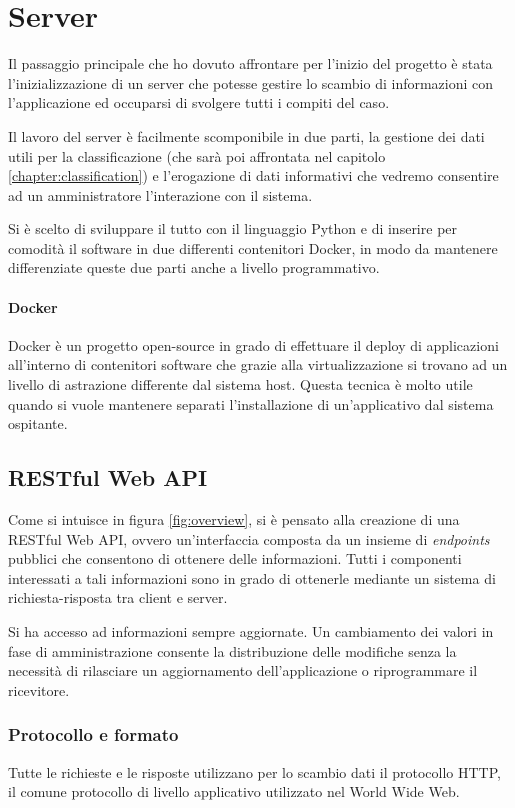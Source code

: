 \chapter{Server}
Il passaggio principale che ho dovuto affrontare per l'inizio del progetto è stata l'inizializzazione
di un server che potesse gestire lo scambio di informazioni con l'applicazione ed occuparsi di svolgere tutti i compiti del caso.

Il lavoro del server è facilmente scomponibile in due parti, la gestione dei dati utili per la classificazione 
(che sarà poi affrontata nel capitolo \ref{chapter:classification}) e l'erogazione di dati informativi che vedremo consentire
ad un amministratore l'interazione con il sistema.

Si è scelto di sviluppare il tutto con il linguaggio Python e di inserire per comodità il software in due differenti contenitori Docker, in modo da 
mantenere differenziate queste due parti anche a livello programmativo.

\subsubsection{Docker}
Docker \cite{docker} è un progetto open-source in grado di effettuare il deploy di applicazioni all'interno di contenitori software che grazie alla
virtualizzazione si trovano ad un livello di astrazione differente dal sistema host. Questa tecnica è molto utile quando si vuole
mantenere separati l'installazione di un'applicativo dal sistema ospitante.



\section{RESTful Web API}
\label{section:api}
Come si intuisce in figura \ref{fig:overview}, si è pensato alla creazione di una RESTful Web API, ovvero un'interfaccia composta da un insieme
di \textit{endpoints} pubblici che consentono di ottenere delle informazioni.
Tutti i componenti interessati a tali informazioni sono in grado di ottenerle mediante un sistema di richiesta-risposta tra client e server. 

Si ha accesso ad informazioni sempre aggiornate. Un cambiamento dei valori in fase di amministrazione consente la 
distribuzione delle modifiche senza la necessità di rilasciare un aggiornamento dell'applicazione o riprogrammare il ricevitore.


\subsection{Protocollo e formato}
Tutte le richieste e le risposte utilizzano per lo scambio dati il protocollo HTTP, il comune protocollo di livello 
applicativo utilizzato nel World Wide Web.

